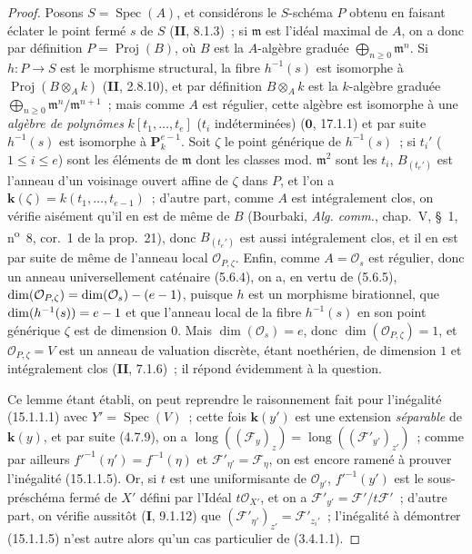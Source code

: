 \begin{proof}
Posons $S=\operatorname{Spec}(A)$, et considérons le $S$-schéma $P$ obtenu en
faisant éclater le point fermé $s$ de $S$ (\textbf{II}, 8.1.3)~; si $\mathfrak m$
est l'idéal maximal de $A$, on a donc par définition
$P=\operatorname{Proj}(B)$, où $B$ est la $A$-algèbre graduée
$\bigoplus_{n\geqslant0}\mathfrak m^n$. Si $h:P\to S$ est le morphisme
structural, la fibre $h^{-1}(s)$ est isomorphe à
$\operatorname{Proj}(B\otimes_A k)$ (\textbf{II}, 2.8.10), et par définition
$B\otimes_A k$ est la $k$-algèbre graduée
$\bigoplus_{n\geqslant0}\mathfrak m^n/\mathfrak m^{n+1}$~; mais comme $A$ est
régulier, cette algèbre est isomorphe à une \emph{algèbre de polynômes}
$k[t_1,\ldots,t_e]$ ($t_i$ indéterminées) ($\mathbf{0}$, 17.1.1)
et par suite $h^{-1}(s)$ est isomorphe à $\mathbf P_k^{e-1}$. Soit $\zeta$ le
point générique de $h^{-1}(s)$~; si $t_i'$ ($1\leqslant i\leqslant e$) sont les
éléments de $\mathfrak m$ dont les classes mod. $\mathfrak m^2$ sont les $t_i$,
$B_{(t_e')}$ est l'anneau d'un voisinage ouvert affine de $\zeta$ dans $P$, et
l'on a $\boldsymbol{k}(\zeta)=k(t_1,\ldots,t_{e-1})$~; d'autre part, comme $A$ est
intégralement clos, on vérifie aisément qu'il en est de même de $B$ (Bourbaki,
\emph{Alg. comm.}, chap.~V, \S~1, n\textsuperscript{o}~8, cor.~1 de la prop.~21),
donc $B_{(t_e')}$ est aussi intégralement clos, et il en est par suite de même de
l'anneau local $\mathcal O_{P,\zeta}$. Enfin, comme $A=\mathcal O_s$ est
régulier, donc un anneau universellement caténaire (5.6.4), on a, en vertu de
(5.6.5),
$\dim(\mathcal O_{P,\zeta})=\dim(\mathcal O_s)-(e- 1)$, puisque $h$ est un
morphisme birationnel, que $\dim(h^{-1}(s))=e- 1$ et que l'anneau local de la
fibre $h^{-1}(s)$ en son point générique $\zeta$ est de dimension $0$. Mais
$\dim(\mathcal O_s)=e$, donc $\dim(\mathcal O_{P,\zeta})=1$, et
$\mathcal O_{P,\zeta}=V$ est un anneau de valuation discrète, étant noethérien,
de dimension $1$ et intégralement clos (\textbf{II}, 7.1.6)~; il répond
évidemment à la question.

Ce lemme étant établi, on peut reprendre le raisonnement fait pour l'inégalité
(15.1.1.1) avec $Y'=\operatorname{Spec}(V)$~; cette fois $\boldsymbol{k}(y')$ est
une extension \emph{séparable} de $\boldsymbol{k}(y)$, et par suite (4.7.9), on a
$\operatorname{long}((\mathcal F_y)_z)=
\operatorname{long}((\mathcal F'_{y'})_{z'})$~; comme par ailleurs
$f'^{-1}(\eta')=f^{-1}(\eta)$ et $\mathcal F'_{\eta'}=\mathcal F_\eta$, on est
encore ramené à prouver l'inégalité (15.1.1.5). Or, si $t$ est une uniformisante
de $\mathcal O_{y'}$, $f'^{-1}(y')$ est le sous-préschéma fermé de $X'$ défini
par l'Idéal $t\mathcal O_{X'}$, et on a
$\mathcal F'_{y'}=\mathcal F'/t\mathcal F'$~; d'autre part, on vérifie aussitôt
(\textbf{I}, 9.1.12) que
$(\mathcal F'_{\eta'})_{z'}=\mathcal F'_{z_i'}$~; l'inégalité à démontrer
(15.1.1.5) n'est autre alors qu'un cas particulier de (3.4.1.1).
\end{proof}

